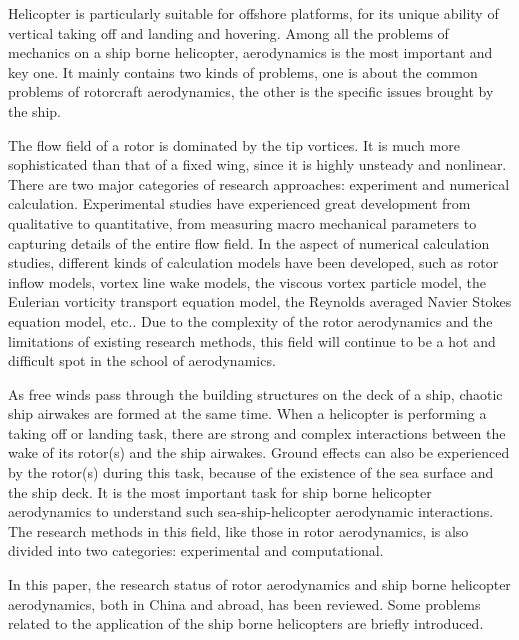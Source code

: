 \documentclass[doctor,openright,twoside,color]{buaathesis}
\begin{document}
\begin{eabstract}
Helicopter is particularly suitable for offshore platforms, for its unique ability of vertical taking off and landing and hovering.
Among all the problems of mechanics on a ship borne helicopter, aerodynamics is the most important and key one.
It mainly contains two kinds of problems, one is about the common problems of rotorcraft aerodynamics, the other is the specific issues brought by the ship.

The flow field of a rotor is dominated by the tip vortices.
It is much more sophisticated than that of a fixed wing, since it is highly unsteady and nonlinear.
There are two major categories of research approaches: experiment and numerical calculation.
Experimental studies have experienced great development from qualitative to quantitative, from measuring macro mechanical parameters to capturing details of the entire flow field.
In the aspect of numerical calculation studies, different kinds of calculation models have been developed, such as rotor inflow models, vortex line wake models, the viscous vortex particle model, 
the Eulerian vorticity transport equation model, the Reynolds averaged Navier Stokes equation model, etc..
Due to the complexity of the rotor aerodynamics and the limitations of existing research methods, this field will continue to be a hot and difficult spot in the school of aerodynamics.

As free winds pass through the building structures on the deck of a ship, chaotic ship airwakes are formed at the same time.
When a helicopter is performing a taking off or landing task, there are strong and complex interactions between the wake of its rotor(s) and the ship airwakes.
Ground effects can also be experienced by the rotor(s) during this task, because of the existence of the sea surface and the ship deck.
It is the most important task for ship borne helicopter aerodynamics to understand such sea-ship-helicopter aerodynamic interactions. 
The research methods in this field, like those in rotor aerodynamics, is also divided into two categories: experimental and computational.

In this paper, the research status of rotor aerodynamics and ship borne helicopter aerodynamics, both in China and abroad, has been reviewed.
Some problems related to the application of the ship borne helicopters are briefly introduced.
\end{eabstract}
  
\tableofcontents
\listoffigures

\end{document}
